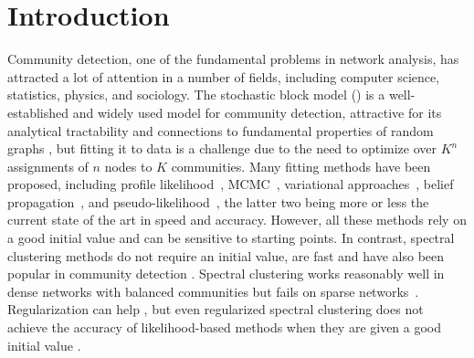 





\section{Introduction}
Community detection, one of the fundamental problems in network analysis, has attracted a lot of attention in a number of fields, including computer science, statistics, physics, and sociology.   The stochastic block model (\SBM) \cite{Holland83} is a well-established and widely used model for community detection, attractive for its analytical tractability and connections to fundamental properties of random graphs \cite{Aldous81, Bickel&Chen2009, Mossel.et.al.2012}, but fitting it to data is a challenge due to the need to optimize over $K^n$ assignments of $n$ nodes to $K$ communities.  Many fitting methods have been proposed, including profile likelihood~\cite{Bickel&Chen2009},  MCMC~\cite{Snijders&Nowicki1997,Nowicki2001},  variational approaches~\cite{Airoldi2008,Celisseetal2011,Bickel&Choi&etal2012},   belief propagation~\cite{Decelle.et.al.2011}, and pseudo-likelihood~\cite{Amini.et.al.2013}, the latter two being more or less the current state of the art in speed and accuracy.  However, all these methods rely on a good initial value and can be sensitive to starting points.   In contrast, spectral clustering methods do not require an initial value, are fast and have also been popular in community detection \cite{Rohe2011, Chaudhuri&Chung&Tsiatas2012, Lei&Rinaldo2013, Qin&Rohe2013}.  Spectral clustering works reasonably well in dense networks with balanced communities but fails on sparse networks~\cite{Le2015}.  Regularization can help \cite{Chaudhuri&Chung&Tsiatas2012, Amini.et.al.2013,Joseph2013}, but even regularized spectral clustering does not achieve the accuracy of likelihood-based methods when they are given a good initial value \cite{Amini.et.al.2013}. 

